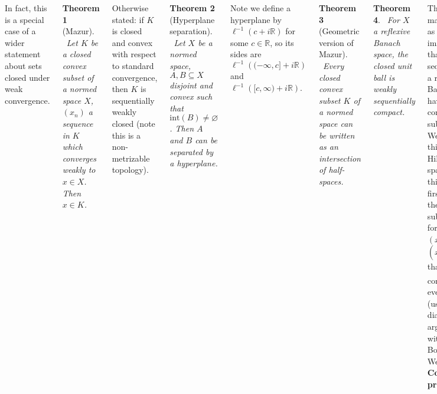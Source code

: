 \documentclass{tikzposter} %
\newcommand{\rightopen}[2]{\ensuremath{[#1,#2)}}
\newcommand{\leftopen}[2]{\ensuremath{(#1,#2]}}
\newtheorem{theorem}{Theorem}
\begin{document}
\begin{columns}
{    In fact, this is a special case of a wider statement about sets closed under weak convergence. \\

    \begin{theorem}[Mazur]
    \ Let $K$ be a closed convex subset of a normed space $X$, $(x_{n})$ a sequence in $K$ which converges weakly to $x \in X$. Then $x \in K$.
    \end{theorem}
    \hphantom{}

    Otherwise stated: if $K$ is closed and convex with respect to standard convergence, then $K$ is sequentially weakly closed (note this is a non-metrizable topology). \\

    \begin{theorem}[Hyperplane separation]
    \ Let $X$ be a normed space, $A, B \subseteq X$ disjoint and convex such that $\mathrm{int}(B) \neq \varnothing$. Then $A$ and $B$ can be separated by a hyperplane.
    \end{theorem}
    \hphantom{}

    Note we define a hyperplane by $\ell^{-1}(c + i \mathbb{R})$ for some $c \in \mathbb{R}$, so its sides are $\ell^{-1}(\leftopen{-\infty}{c}+i\mathbb{R})$ and $\ell^{-1}(\rightopen{c}{\infty}+i\mathbb{R})$.  \\

    \begin{theorem}[Geometric version of Mazur]
    \ Every closed convex subset $K$ of a normed space can be written as an intersection of half-spaces.
    \end{theorem}
    \hphantom{}

    \begin{theorem}
    \ For $X$ a reflexive Banach space, the closed unit ball is weakly sequentially compact.
    \end{theorem}
    \hphantom{}

    This is a major result, as it gives us immediately that bounded sequences in a reflexive Banach space have weakly convergent subsequences. \\

    We prove this only for Hilbert spaces. To do this, we show first that there is a subsequence for any $(x_{n})$, $(x_{n_{j}})$ such that $\langle x_{n_{j}}, x_{m} \rangle$ converges for every $m$ (using a diagonal argument with Bolzano-Weierstrass). \textbf{Complete proof later.} \\

    \begin{theorem}[Eberlein]
    \ The closed unit ball in a Banach space is weakly sequentially compact iff the space is reflexive.
    \end{theorem}
    \hphantom{}

}
\end{columns}
\end{document}
